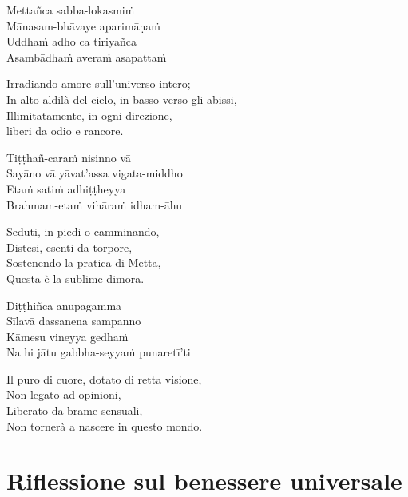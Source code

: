 Mettañca sabba-lokasmiṁ\\
Mānasam-bhāvaye aparimāṇaṁ\\
Uddhaṁ adho ca tiriyañca\\
Asambādhaṁ averaṁ asapattaṁ

\begin{english}
Irradiando amore sull'universo intero;\\
In alto aldilà del cielo, in basso verso gli abissi,\\
Illimitatamente, in ogni direzione,\\
 liberi da odio e rancore.
\end{english}

\clearpage


Tiṭṭhañ-caraṁ nisinno vā\\
Sayāno vā yāvat'assa vigata-middho\\
Etaṁ satiṁ adhiṭṭheyya\\
Brahmam-etaṁ vihāraṁ idham-āhu

\begin{english}
Seduti, in piedi o camminando,\\
Distesi, esenti da torpore,\\
Sostenendo la pratica di Mettā,\\ 
Questa è la sublime dimora.
\end{english}

Diṭṭhiñca anupagamma\\
Sīlavā dassanena sampanno\\
Kāmesu vineyya gedhaṁ\\
Na hi jātu gabbha-seyyaṁ punaretī'ti

\begin{english}
  Il puro di cuore, dotato di retta visione,\\
Non legato ad opinioni,\\
Liberato da brame sensuali,\\
Non tornerà a nascere in questo mondo.
\end{english}

\clearpage


\chapter[Benessere universale]{Riflessione sul benessere universale}


\delegateSetUseNext

\begin{leader}
\end{leader}

